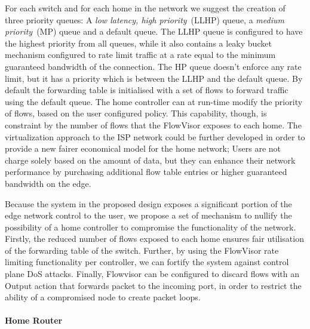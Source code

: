 For each switch and for each home in the network we suggest the creation of
three priority queues: A {\it low latency, high priority}~(LLHP) queue, a {\it
  medium priority}~(MP) queue and a default queue.  The LLHP queue is configured
to have the highest priority from all queues, while it also contains a leaky
bucket mechanism configured to rate limit traffic at a rate equal to the minimum
guaranteed bandwidth of the connection. The HP queue doesn't enforce any rate
limit, but it has a priority which is between the LLHP and the default queue.
By default the forwarding table is initialised with a set of flows to forward
traffic using the default queue. The home \of controller can at run-time modify
the priority of flows, based on the user configured policy.  This capability,
though, is constraint by the number of flows that the FlowVisor exposes to each
home.  The virtualization approach to the ISP network could be further developed
in order to provide a new fairer economical model for the home network; Users
are not charge solely based on the amount of data, but they can enhance their
network performance by purchasing additional flow table entries or higher
guaranteed bandwidth on the edge. 

Because the system in the proposed design exposes a significant portion of the
edge network control to the user, we propose a set of mechanism to nullify the
possibility of a home \of controller to compromise the functionality of the
network.  Firstly, the reduced number of flows exposed to each home ensures fair
utilisation of the forwarding table of the switch. Further, by using the
FlowVisor rate limiting functionality per controller, we can fortify the system
against control plane DoS attacks. Finally, Flowvisor can be configured to
discard flows with an Output action that forwards packet to the incoming port,
in order to restrict the ability of a compromised node to create packet loops. 

\paragraph*{Home Router}


